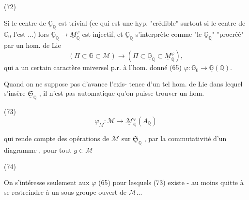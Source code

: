 (72)

Si le centre de $\underline{\mathbb{G}}_\mathbb{Q}$ est trivial (ce qui est
une hyp. "crédible" surtout si le centre de
$\mathbb{G}_0$ l'est ...) lors $\underline{\mathbb{G}}_\mathbb{Q} \to \underline{M}^\varphi_\mathbb{Q}$ est
injectif, et $\underline{\mathbb{G}}_\mathbb{Q}$ s'interprète comme
"le $\underline{\mathbb{G}}_\mathbb{Q}$" "procréé" par un hom. de
Lie
$$ (\Pi \subset \mathbb{G} \subset \mathcal{M}) \longrightarrow (\Pi \subset \underline{\mathbb{G}}_\mathbb{Q} \subset \underline{M}^\varphi_\mathbb{Q}) , $$
qui a un certain caractère universel
p.r. à l'hom. donné (65) $\varphi : \mathbb{G}_0 \to \underline{\mathbb{G}}(\mathbb{Q})$.

\newpage


Quand on ne suppose pas d'avance l'exis-
tence d'un tel hom. de Lie dans lequel
s'insère $\underline{\mathfrak{S}}_\mathbb{Q}$ , il n'est pas automatique
qu'on puisse trouver un hom.

(73) $$\varphi_M : \mathcal{M} \longrightarrow \underline{\mathcal{M}}_\mathbb{Q}^\varphi (A_\mathbb{Q})$$

qui rende compte des opérations de
$\mathcal{M}$ sur $\underline{\mathfrak{S}}_\mathbb{Q}$ , par la commutativité
d'un diagramme , pour tout $g \in \mathcal{M}$

(74)

On s'intéresse seulement aux $\varphi$ (65)
pour lesquels (73) existe - au moins
quitte à se restreindre à un sous-groupe
ouvert de $\mathcal{M}$...

